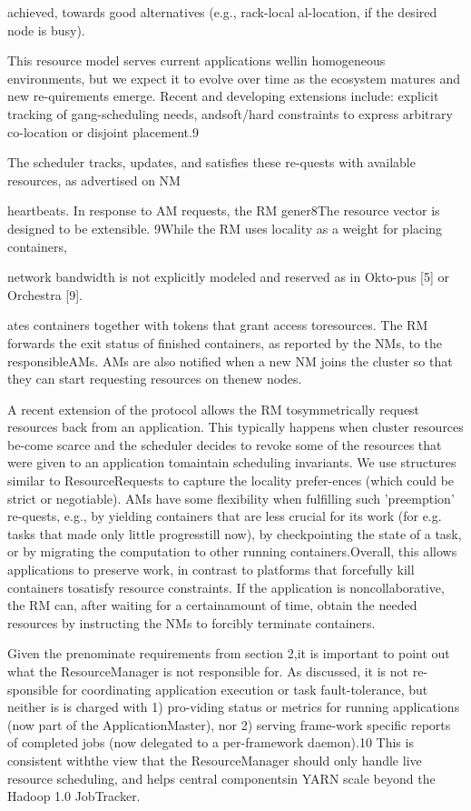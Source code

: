 achieved, towards good alternatives (e.g., rack-local al-location, if the desired node is busy).

This resource model serves current applications wellin homogeneous environments, but we expect it to
evolve over time as the ecosystem matures and new re-quirements emerge. Recent and developing extensions
include: explicit tracking of gang-scheduling needs, andsoft/hard constraints to express arbitrary co-location or
disjoint placement.9

The scheduler tracks, updates, and satisfies these re-quests with available resources, as advertised on NM

heartbeats. In response to AM requests, the RM gener8The resource vector is designed to be extensible.
9While the RM uses locality as a weight for placing containers,

network bandwidth is not explicitly modeled and reserved as in Okto-pus [5] or Orchestra [9].

ates containers together with tokens that grant access toresources. The RM forwards the exit status of finished
containers, as reported by the NMs, to the responsibleAMs. AMs are also notified when a new NM joins the
cluster so that they can start requesting resources on thenew nodes.

A recent extension of the protocol allows the RM tosymmetrically request resources back from an application. This typically happens when cluster resources be-come scarce and the scheduler decides to revoke some
of the resources that were given to an application tomaintain scheduling invariants. We use structures similar to ResourceRequests to capture the locality prefer-ences (which could be strict or negotiable). AMs have
some flexibility when fulfilling such 'preemption' re-quests, e.g., by yielding containers that are less crucial
for its work (for e.g. tasks that made only little progresstill now), by checkpointing the state of a task, or by
migrating the computation to other running containers.Overall, this allows applications to preserve work, in
contrast to platforms that forcefully kill containers tosatisfy resource constraints. If the application is noncollaborative, the RM can, after waiting for a certainamount of time, obtain the needed resources by instructing the NMs to forcibly terminate containers.

Given the prenominate requirements from section 2,it is important to point out what the ResourceManager is not responsible for. As discussed, it is not re-sponsible for coordinating application execution or task
fault-tolerance, but neither is is charged with 1) pro-viding status or metrics for running applications (now
part of the ApplicationMaster), nor 2) serving frame-work specific reports of completed jobs (now delegated
to a per-framework daemon).10 This is consistent withthe view that the ResourceManager should only handle
live resource scheduling, and helps central componentsin YARN scale beyond the Hadoop 1.0 JobTracker.

